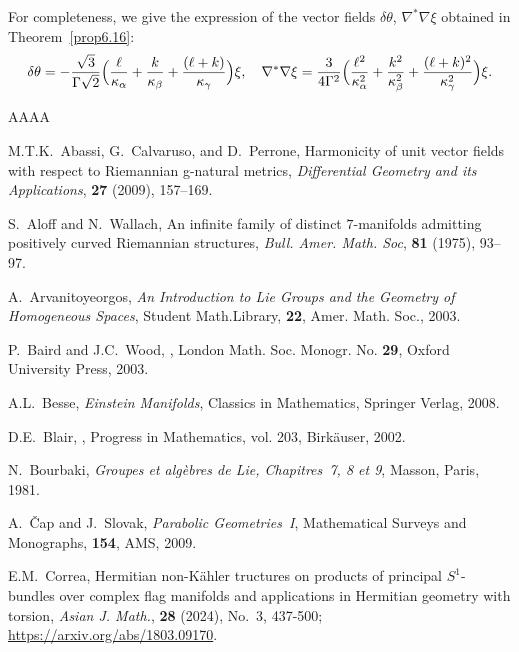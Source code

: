 \documentclass[a4paper,reqno]{amsart}
\theoremstyle{definition}
\theoremstyle{remark}
\theoremstyle{plain}
\numberwithin{equation}{section}
\begin{document}
For completeness, we give the expression of the vector fields
$\delta \theta$, $\nabla^* \nabla \xi$ obtained in
Theorem~\ref{prop6.16}:
\[
  \delta \theta= -\frac{\sqrt{3}}{\Gamma\sqrt{2}}
  \Bigl(\frac{\ell}{\kappa_\alpha} + \frac{k}{\kappa_\beta} +
  \frac{(\ell +k)}{\kappa_\gamma}\Bigr)\xi, \quad
  \nabla^*\nabla \xi = \frac{3}{4\Gamma^2}
  \Bigl(\frac{\ell^2}{\kappa_\alpha^2} +
  \frac{k^2}{\kappa_\beta^2} + \frac{(\ell
    +k)^2}{\kappa_\gamma^2}\Bigr)\xi.
\]





\begin{thebibliography}{AAAA}

   M.T.K.~Abassi, G.~Calvaruso, and D.~Perrone,
  Harmonicity of unit vector fields with respect to Riemannian
  g-natural metrics, \emph{Differential Geometry and its
    Applications}, \textbf{27} (2009), 157--169.


     S.~Aloff and N.~Wallach, An infinite family of
distinct $7$-manifolds admitting positively curved Riemannian
structures, \emph{Bull. Amer. Math. Soc}, \textbf{81} (1975),
93--97.


    A.~Arvanitoyeorgos, \emph{An Introduction
to Lie Groups and the Geometry of Homogeneous Spaces}, Student
Math.Library, \textbf{22}, Amer. Math. Soc., 2003.



P.~Baird and J.C.~Wood,
,
\newblock London Math. Soc. Monogr. No. {\bf{29}}, Oxford
University Press, 2003.

  A.L.~Besse, \emph{Einstein
 Manifolds}, Classics in Mathematics, Springer Verlag, 2008.
    

D.E.~Blair,
, 
\newblock Progress in Mathematics, vol. 203, Birk\"auser, 2002.


     
    N.~Bourbaki, {\it Groupes et alg\`ebres
de Lie, Chapitres~7, 8 et 9}, Masson, Paris, 1981.

 A.~\v{C}ap and J.~Slovak, \emph{Parabolic
Geometries~I}, Mathematical Surveys and Monographs, \textbf{154},
AMS, 2009.

 E.M.~Correa, Hermitian non-K\"ahler
tructures on products of principal $S^1$-bundles over complex
flag manifolds and applications in Hermitian geometry with
torsion, \emph{Asian J.  Math.}, \textbf{28} (2024),
No.~3, 437-500; %
\url{https://arxiv.org/abs/1803.09170}.


\end{thebibliography}
\end{document}

